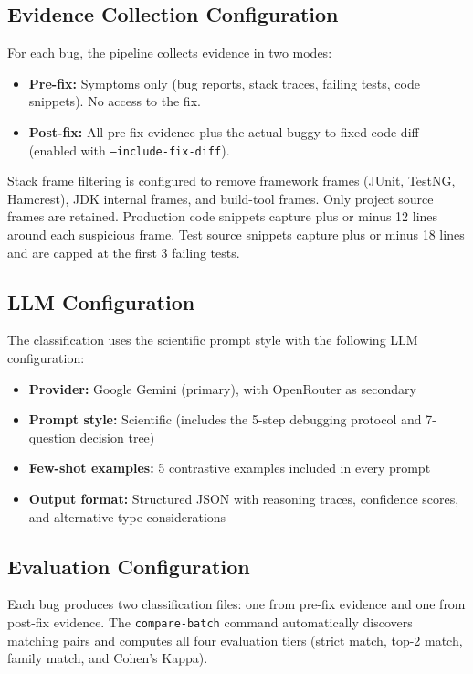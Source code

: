 \documentclass{iutbscthesis}
\begin{document}
\subsection{Evidence Collection Configuration}

For each bug, the pipeline collects evidence in two modes:
\begin{itemize}
    \item \textbf{Pre-fix:} Symptoms only (bug reports, stack traces, failing tests, code snippets). No access to the fix.
    \item \textbf{Post-fix:} All pre-fix evidence plus the actual buggy-to-fixed code diff (enabled with \texttt{--include-fix-diff}).
\end{itemize}

Stack frame filtering is configured to remove framework frames (JUnit, TestNG, Hamcrest), JDK internal frames, and build-tool frames. Only project source frames are retained. Production code snippets capture plus or minus 12 lines around each suspicious frame. Test source snippets capture plus or minus 18 lines and are capped at the first 3 failing tests.

\subsection{LLM Configuration}

The classification uses the scientific prompt style with the following LLM configuration:
\begin{itemize}
    \item \textbf{Provider:} Google Gemini (primary), with OpenRouter as secondary
    \item \textbf{Prompt style:} Scientific (includes the 5-step debugging protocol and 7-question decision tree)
    \item \textbf{Few-shot examples:} 5 contrastive examples included in every prompt
    \item \textbf{Output format:} Structured JSON with reasoning traces, confidence scores, and alternative type considerations
\end{itemize}

\subsection{Evaluation Configuration}

Each bug produces two classification files: one from pre-fix evidence and one from post-fix evidence. The \texttt{compare-batch} command automatically discovers matching pairs and computes all four evaluation tiers (strict match, top-2 match, family match, and Cohen's Kappa).
\end{document}
